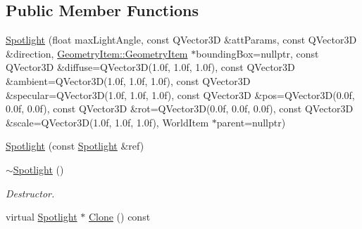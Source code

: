 \subsection*{Public Member Functions}
\begin{DoxyCompactItemize}
\item 
\mbox{\hyperlink{class_geometry_engine_1_1_geometry_world_item_1_1_geometry_light_1_1_spotlight_ad7bc16302cf245e1f71d8c9af23d3a20}{Spotlight}} (float max\+Light\+Angle, const Q\+Vector3D \&att\+Params, const Q\+Vector3D \&direction, \mbox{\hyperlink{class_geometry_engine_1_1_geometry_world_item_1_1_geometry_item_1_1_geometry_item}{Geometry\+Item\+::\+Geometry\+Item}} $\ast$bounding\+Box=nullptr, const Q\+Vector3D \&diffuse=Q\+Vector3D(1.\+0f, 1.\+0f, 1.\+0f), const Q\+Vector3\+D \&ambient=\+Q\+Vector3\+D(1.\+0f, 1.\+0f, 1.\+0f), const Q\+Vector3\+D \&specular=\+Q\+Vector3\+D(1.\+0f, 1.\+0f, 1.\+0f), const Q\+Vector3\+D \&pos=\+Q\+Vector3\+D(0.\+0f, 0.\+0f, 0.\+0f), const Q\+Vector3\+D \&rot=\+Q\+Vector3\+D(0.\+0f, 0.\+0f, 0.\+0f), const Q\+Vector3\+D \&scale=\+Q\+Vector3\+D(1.\+0f, 1.\+0f, 1.\+0f), World\+Item $\ast$parent=nullptr)
\item 
\mbox{\hyperlink{class_geometry_engine_1_1_geometry_world_item_1_1_geometry_light_1_1_spotlight_a9d503c8da14980a0e7df3c9c0edde42c}{Spotlight}} (const \mbox{\hyperlink{class_geometry_engine_1_1_geometry_world_item_1_1_geometry_light_1_1_spotlight}{Spotlight}} \&ref)
\item 
\mbox{\label{class_geometry_engine_1_1_geometry_world_item_1_1_geometry_light_1_1_spotlight_a316a8bfae90cfab961bb11f5242c82af}} 
\mbox{\hyperlink{class_geometry_engine_1_1_geometry_world_item_1_1_geometry_light_1_1_spotlight_a316a8bfae90cfab961bb11f5242c82af}{$\sim$\+Spotlight}} ()
\begin{DoxyCompactList}\small\item\em Destructor. \end{DoxyCompactList}\item 
virtual \mbox{\hyperlink{class_geometry_engine_1_1_geometry_world_item_1_1_geometry_light_1_1_spotlight}{Spotlight}} $\ast$ \mbox{\hyperlink{class_geometry_engine_1_1_geometry_world_item_1_1_geometry_light_1_1_spotlight_a7feb062f72b8110cf7d8d614d2daad92}{Clone}} () const
\end{DoxyCompactItemize}
